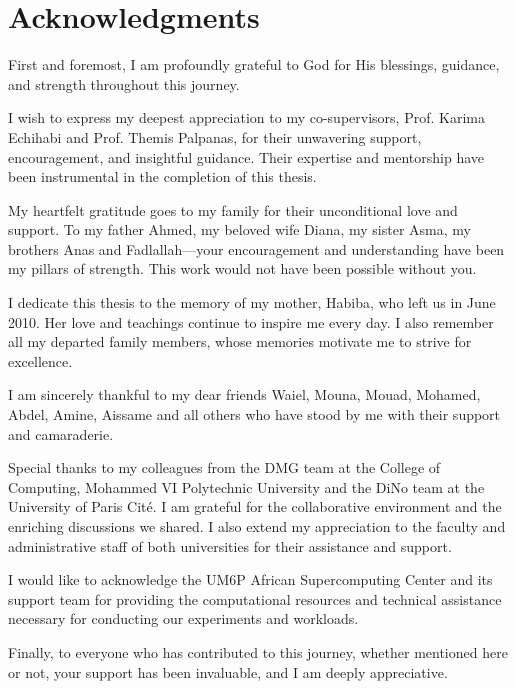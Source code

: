 \section*{Acknowledgments}

First and foremost, I am profoundly grateful to God for His blessings, guidance, and strength throughout this journey.

I wish to express my deepest appreciation to my co-supervisors, Prof. Karima Echihabi and Prof. Themis Palpanas, for their unwavering support, encouragement, and insightful guidance. Their expertise and mentorship have been instrumental in the completion of this thesis.

My heartfelt gratitude goes to my family for their unconditional love and support. To my father Ahmed, my beloved wife Diana, my sister Asma, my brothers Anas and Fadlallah—your encouragement and understanding have been my pillars of strength. This work would not have been possible without you.

I dedicate this thesis to the memory of my mother, Habiba, who left us in June 2010. Her love and teachings continue to inspire me every day. I also remember all my departed family members, whose memories motivate me to strive for excellence.

I am sincerely thankful to my dear friends Waiel, Mouna, Mouad, Mohamed, Abdel, Amine, Aissame and all others who have stood by me with their support and camaraderie.

Special thanks to my colleagues from the DMG team at the College of Computing, Mohammed VI Polytechnic University and the DiNo team at the University of Paris Cité. I am grateful for the collaborative environment and the enriching discussions we shared. I also extend my appreciation to the faculty and administrative staff of both universities for their assistance and support.

I would like to acknowledge the UM6P African Supercomputing Center and its support team for providing the computational resources and technical assistance necessary for conducting our experiments and workloads.

Finally, to everyone who has contributed to this journey, whether mentioned here or not, your support has been invaluable, and I am deeply appreciative.
